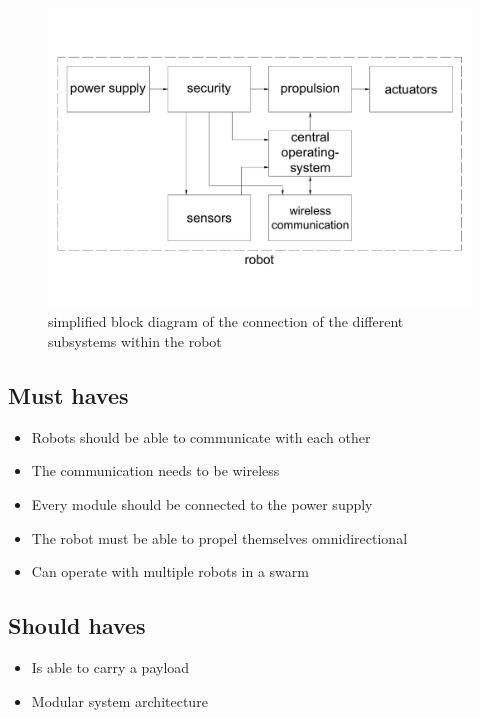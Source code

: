 \documentclass[10pt,a4paper]{article}
\begin{document}
\begin{figure}[h]
    \centering
    \includegraphics[width=1\textwidth]{blockschematic}
    \caption{simplified block diagram of the connection of the different subsystems within the robot }
    \label{fig:blockschematic}
\end{figure}




\subsection{Must haves}
\begin{itemize}
\item Robots should be able to communicate with each other
\item The communication needs to be wireless
\item Every module should be connected to the power supply
\item The robot must be able to propel themselves omnidirectional
\item Can operate with multiple robots in a swarm
\end{itemize}

\subsection{Should haves}
\begin{itemize}
\item Is able to carry a payload
\item Modular system architecture
\end{itemize}
\end{document}
